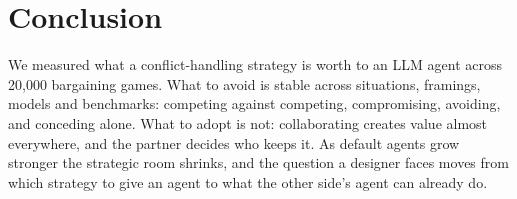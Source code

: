 \section{Conclusion}
\label{sec:conclusion}
We measured what a conflict-handling strategy is worth to an LLM agent across 20{,}000 bargaining games. What to avoid is stable across situations, framings, models and benchmarks: competing against competing, compromising, avoiding, and conceding alone. What to adopt is not: collaborating creates value almost everywhere, and the partner decides who keeps it. As default agents grow stronger the strategic room shrinks, and the question a designer faces moves from which strategy to give an agent to what the other side's agent can already do.

